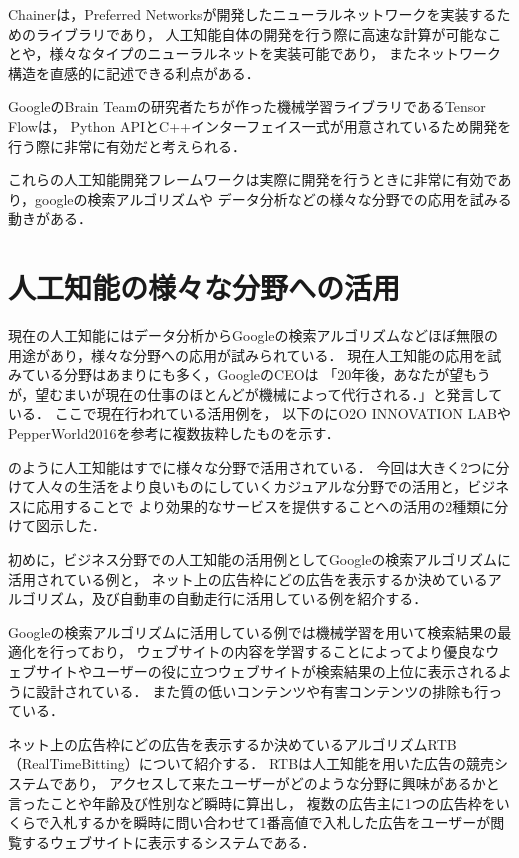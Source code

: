 Chainerは，Preferred Networksが開発したニューラルネットワークを実装するためのライブラリであり，
人工知能自体の開発を行う際に高速な計算が可能なことや，様々なタイプのニューラルネットを実装可能であり，
またネットワーク構造を直感的に記述できる利点がある．

GoogleのBrain Teamの研究者たちが作った機械学習ライブラリであるTensor Flowは，
Python APIとC++インターフェイス一式が用意されているため開発を行う際に非常に有効だと考えられる．

これらの人工知能開発フレームワークは実際に開発を行うときに非常に有効であり，googleの検索アルゴリズムや
データ分析などの様々な分野での応用を試みる動きがある．

\section{人工知能の様々な分野への活用}
現在の人工知能にはデータ分析からGoogleの検索アルゴリズムなどほぼ無限の用途があり，様々な分野への応用が試みられている．
現在人工知能の応用を試みている分野はあまりにも多く，GoogleのCEOは
「20年後，あなたが望もうが，望むまいが現在の仕事のほとんどが機械によって代行される．」\cite{ceo}と発言している．
ここで現在行われている活用例を，
以下のにO2O INNOVATION LAB\cite{lab}やPepperWorld2016\cite{Pepper2}を参考に複数抜粋したものを示す．


のように人工知能はすでに様々な分野で活用されている．
今回は大きく2つに分けて人々の生活をより良いものにしていくカジュアルな分野での活用と，ビジネスに応用することで
より効果的なサービスを提供することへの活用の2種類に分けて図示した．

初めに，ビジネス分野での人工知能の活用例としてGoogleの検索アルゴリズムに活用されている例と，
ネット上の広告枠にどの広告を表示するか決めているアルゴリズム，及び自動車の自動走行に活用している例を紹介する．

Googleの検索アルゴリズムに活用している例では機械学習を用いて検索結果の最適化を行っており，
ウェブサイトの内容を学習することによってより優良なウェブサイトやユーザーの役に立つウェブサイトが検索結果の上位に表示されるように設計されている．
また質の低いコンテンツや有害コンテンツの排除も行っている．

ネット上の広告枠にどの広告を表示するか決めているアルゴリズムRTB（RealTimeBitting）について紹介する．
RTBは人工知能を用いた広告の競売システムであり，
アクセスして来たユーザーがどのような分野に興味があるかと言ったことや年齢及び性別など瞬時に算出し，
複数の広告主に1つの広告枠をいくらで入札するかを瞬時に問い合わせて1番高値で入札した広告をユーザーが閲覧するウェブサイトに表示するシステムである．

